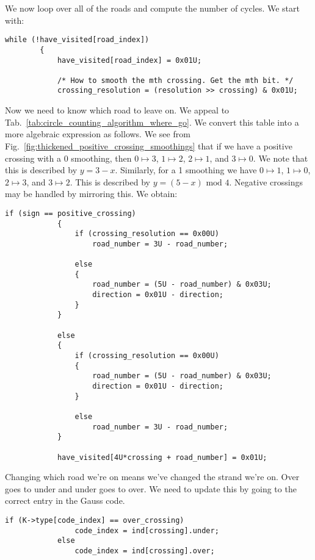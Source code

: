         We now loop over all of the roads and compute the number of cycles. We
        start with:
\begin{lstlisting}[style=CStyle, firstnumber = 64]
        while (!have_visited[road_index])
        {
            have_visited[road_index] = 0x01U;

            /* How to smooth the mth crossing. Get the mth bit. */
            crossing_resolution = (resolution >> crossing) & 0x01U;
\end{lstlisting}
        Now we need to know which road to leave on. We appeal to
        Tab.~\ref{tab:circle_counting_algorithm_where_go}. We convert this table
        into a more algebraic expression as follows. We see from
        Fig.~\ref{fig:thickened_positive_crossing_smoothings} that if we have a
        positive crossing with a 0 smoothing, then
        $0\mapsto{3}$, $1\mapsto{2}$, $2\mapsto{1}$, and $3\mapsto{0}$. We note
        that this is described by $y=3-x$. Similarly, for a 1 smoothing we have
        $0\mapsto{1}$, $1\mapsto{0}$, $2\mapsto{3}$, and $3\mapsto{2}$. This
        is described by $y=(5-x)\textrm{ mod }4$. Negative crossings may be
        handled by mirroring this. We obtain:
\begin{lstlisting}[style=CStyle, firstnumber = 71]
            if (sign == positive_crossing)
            {
                if (crossing_resolution == 0x00U)
                    road_number = 3U - road_number;

                else
                {
                    road_number = (5U - road_number) & 0x03U;
                    direction = 0x01U - direction;
                }
            }

            else
            {
                if (crossing_resolution == 0x00U)
                {
                    road_number = (5U - road_number) & 0x03U;
                    direction = 0x01U - direction;
                }

                else
                    road_number = 3U - road_number;
            }

            have_visited[4U*crossing + road_number] = 0x01U;
\end{lstlisting}
        Changing which road we're on means we've changed the strand we're on.
        Over goes to under and under goes to over. We need to update this by
        going to the correct entry in the Gauss code.
\begin{lstlisting}[style=CStyle, firstnumber=97]
            if (K->type[code_index] == over_crossing)
                code_index = ind[crossing].under;
            else
                code_index = ind[crossing].over;
\end{lstlisting}
